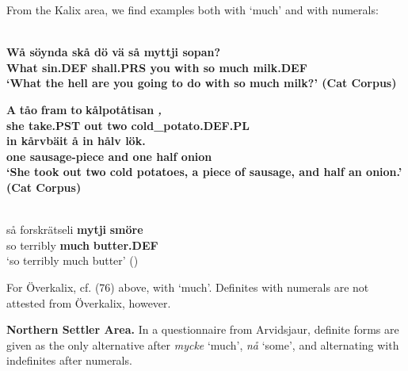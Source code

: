 
From the Kalix area, we find examples both with ‘much’ and with numerals:


\ea\label{}
\\
\gll \bfseries Wå  söynda  skå  dö  vä  så  myttji  sopan?\\
\bfseries What  sin.DEF  shall.PRS  you  with  so  much  milk.DEF\\
\glt ‘What the hell are you going to do with so \textbf{much milk}?’ (Cat Corpus)

\z

\ea
\gll \textbf{A} \textbf{tåo} \textbf{fram} \textbf{to} \textbf{\textit{  }} \textbf{kålpotåtisan} \textbf{\textit{,}}\\
\bfseries
she  take.PST  out  two  cold\_potato.DEF.PL\\
\gll in  kårvbäit  å  in  hålv  lök.\\
one  sausage-piece  and  one  half  onion\\
\glt ‘She took out two cold potatoes, a piece of sausage, and half an onion.’ (Cat Corpus)

\z

\ea \label{} 
\\
\gll så  forskrätseli  \textbf{mytji} \textbf{smöre}\\
so  terribly  \textbf{much} \textbf{butter.DEF}\\
\glt ‘so terribly much butter’ (\citet{Stenberg1971})

\z

For Överkalix, cf. (76) above, with ‘much’. Definites with numerals are not attested from Överkalix, however.


\textbf{Northern Settler Area. }In a questionnaire from Arvidsjaur, definite forms are given as the only alternative after \textit{mycke} ‘much’, \textit{nå} ‘some’, and alternating with indefinites after numerals.


